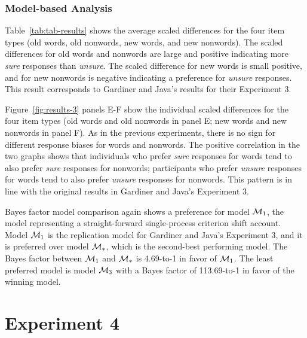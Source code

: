 \documentclass[english,,man,floatsintext]{apa6}
\begin{document}
\hypertarget{model-based-analysis-2}{%
\subsubsection{Model-based Analysis}\label{model-based-analysis-2}}

Table~\ref{tab:tab-results} shows the average scaled differences for the four item types (old words, old nonwords, new words, and new nonwords). The scaled differences for old words and nonwords are large and positive indicating more \emph{sure} responses than \emph{unsure}. The scaled difference for new words is small positive, and for new nonwords is negative indicating a preference for \emph{unsure} responses. This result corresponds to Gardiner and Java's results for their Experiment 3.

Figure~\ref{fig:results-3} panels E-F show the individual scaled differences for the four item types (old words and old nonwords in panel E; new words and new nonwords in panel F). As in the previous experiments, there is no sign for different response biases for words and nonwords. The positive correlation in the two graphs shows that individuals who prefer \emph{sure} responses for words tend to also prefer \emph{sure} responses for nonwords; participants who prefer \emph{unsure} responses for words tend to also prefer \emph{unsure} responses for nonwords. This pattern is in line with the original results in Gardiner and Java's Experiment 3.

Bayes factor model comparison again shows a preference for model \({\cal M}_{1}\), the model representing a straight-forward single-process criterion shift account. Model \({\cal M}_{1}\) is the replication model for Gardiner and Java's Experiment 3, and it is preferred over model \({\cal M}_{*}\), which is the second-best performing model. The Bayes factor between \({\cal M}_{1}\) and \({\cal M}_{*}\) is 4.69-to-1 in favor of \({\cal M}_{1}\). The least preferred model is model \({\cal M}_3\) with a Bayes factor of 113.69-to-1 in favor of the winning model.

\hypertarget{experiment-4}{%
\section{Experiment 4}\label{experiment-4}}
\end{document}
